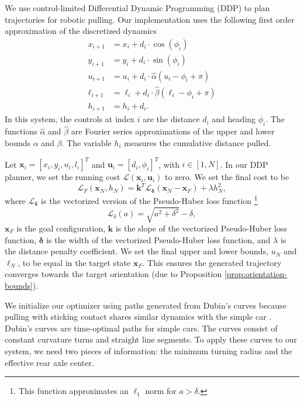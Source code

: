 \documentclass[conference]{IEEEtran}
\begin{document}
We use control-limited Differential Dynamic Programming (DDP)
\cite{tassa2014control} to plan trajectories for robotic pulling.  Our
implementation uses the following first order approximation of the
discretized dynamics
\begin{align}
  x_{i+1} &= x_i + d_i\cdot\cos(\phi_i) \\
  y_{i+1} &= y_i + d_i\cdot\sin(\phi_i)\\
  u_{i+1} &= u_i + d_i\cdot\hat{\alpha}(u_i - \phi_i + \pi) \\
  \ell_{i+1} &= \ell_i + d_i\cdot\hat{\beta}(\ell_i - \phi_i + \pi)\\
  h_{i+1} &= h_i + d_i.
\end{align}
In this system, the controls at index $i$ are the distance $d_i$ and
heading $\phi_i$. The functions $\hat{\alpha}$ and $\hat{\beta}$ are
Fourier series approximations of the upper and lower bounds $\alpha$
and $\beta$. The variable $h_i$ measures the cumulative distance
pulled.

Let $\mathbf{x}_i = [x_i,y_i,u_i,l_i]^T$ and
$\mathbf{u}_i = [d_i,\phi_i]^T$, with $i\in[1,N]$. In our DDP planner,
we set the running cost $\mathcal{L}(\mathbf{x}_i,\mathbf{u}_i)$ to
zero. We set the final cost to be
\begin{equation}
\mathcal{L}_F(\mathbf{x}_N,h_N) = \mathbf{k}^T\mathcal{L}_{\bm{\delta}}(\mathbf{x}_N-\mathbf{x}_F) + \lambda h_N^2,
\end{equation}
where $\mathcal{L}_{\bm{\delta}}$ is the vectorized version of the
Pseudo-Huber loss function \footnote{This function approximates an
  $\ell_1$ norm for $a > \delta$.}
\begin{equation}
\mathcal{L}_{\delta}(a) = \sqrt{a^2+\delta^2}-\delta,
\end{equation}
$\mathbf{x}_F$ is the goal configuration, $\mathbf{k}$ is the slope of
the vectorized Pseudo-Huber loss function, $\bm{\delta}$ is the width
of the vectorized Pseudo-Huber loss function, and $\lambda$ is the
distance penalty coefficient. We set the final upper and lower bounds,
$u_N$ and $\ell_N$, to be equal in the target state
$\mathbf{x}_F$. This ensures the generated trajectory converges
towards the target orientation (due to Proposition
\ref{prop:orientation-bounds}).

We initialize our optimizer using paths generated from Dubin's curves
\cite{dubins1957curves} because pulling with sticking contact shares
similar dynamics with the simple car \cite{lavalle1999planning}.
Dubin's curves are time-optimal paths for simple cars. The curves
consist of constant curvature turns and straight line segments. To
apply these curves to our system, we need two pieces of information:
the minimum turning radius and the effective rear axle center. 
\end{document}
